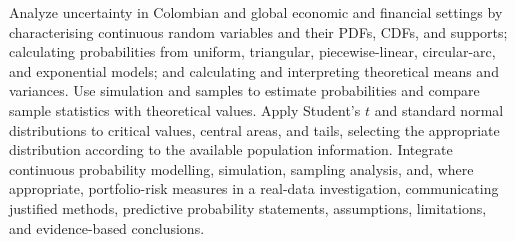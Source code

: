 \documentclass[10pt,letterpaper]{article}
\begin{document}
\begin{minipage}[t]{0.34\textwidth}
    \begin{bluebox}
        \fontsize{8.15}{10.35}\selectfont
        Analyze uncertainty in Colombian and global economic and financial settings by characterising continuous random variables and their PDFs, CDFs, and supports; calculating probabilities from uniform, triangular, piecewise-linear, circular-arc, and exponential models; and calculating and interpreting theoretical means and variances. Use simulation and samples to estimate probabilities and compare sample statistics with theoretical values. Apply Student's $t$ and standard normal distributions to critical values, central areas, and tails, selecting the appropriate distribution according to the available population information. Integrate continuous probability modelling, simulation, sampling analysis, and, where appropriate, portfolio-risk measures in a real-data investigation, communicating justified methods, predictive probability statements, assumptions, limitations, and evidence-based conclusions.
    \end{bluebox}
\end{minipage}%
\hfill
\end{document}
